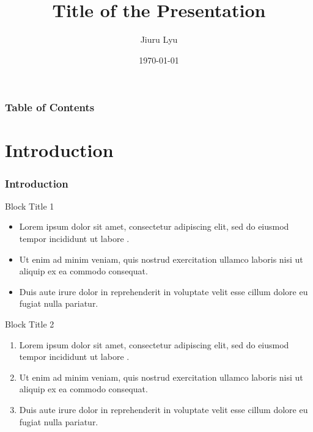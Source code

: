 \documentclass[aspectratio=43, 9pt, utf8, mathserif]{beamer}
\author[My name]{Jiuru Lyu}
\title[Name to be Include]{Title of the Presentation}
\institute[My institution]{Full name of my institution}
\date{\today}
\begin{document}
\everymath{\displaystyle}

\LogoOn
\begin{frame}
    \titlepage 
\end{frame}
\LogoOff

\begin{frame}
    \frametitle{\textbf{Table of Contents}}
    \tableofcontents %
\end{frame}

\section{Introduction}\label{sec:introduction}
\begin{frame}
\frametitle{\textbf{Introduction}}
\begin{block}{Block Title 1}
\begin{itemize}
    \item Lorem ipsum dolor sit amet, consectetur adipiscing elit, sed do eiusmod tempor incididunt ut labore . 
    \item Ut enim ad minim veniam, quis nostrud exercitation ullamco laboris nisi ut aliquip ex ea commodo consequat.
    \item Duis aute irure dolor in reprehenderit in voluptate velit esse cillum dolore eu fugiat nulla pariatur.  \end{itemize}
\end{block}
    
\begin{exampleblock}{Block Title 2}
\begin{enumerate}
    \item Lorem ipsum dolor sit amet, consectetur adipiscing elit, sed do eiusmod tempor incididunt ut labore . 
    \item Ut enim ad minim veniam, quis nostrud exercitation ullamco laboris nisi ut aliquip ex ea commodo consequat.
    \item Duis aute irure dolor in reprehenderit in voluptate velit esse cillum dolore eu fugiat nulla pariatur.  \end{enumerate}
\end{exampleblock}
\end{frame}

\end{document}
